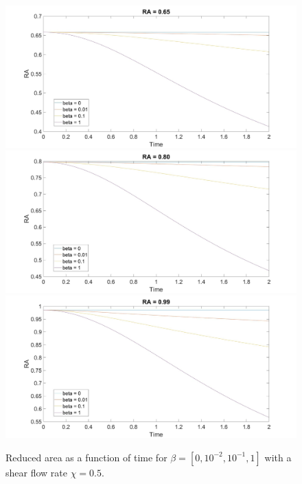 \documentclass[aps,prl,showpacs]{revtex4}
\begin{document}
\begin{figure}
	\centering
	\includegraphics[width=.9\textwidth]{figures/4.jpg}
	\includegraphics[width=.9\textwidth]{figures/5.jpg}
	\includegraphics[width=.9\textwidth]{figures/6.jpg}
	\caption{Reduced area as a function of time for $\beta = [0, 10^{-2},10^{-1}, 1]$ with a shear flow rate $\chi = 0.5$.}
\end{figure}
\end{document}
